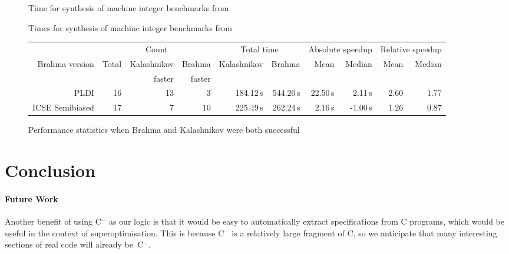\documentclass[a4paper]{llncs}
\newcommand{\newC}{C$^-$\xspace}
\begin{document}
\begin{figure}
\begin{center}
{\tiny

}
\end{center}
\caption{Time for synthesis of machine integer benchmarks from~\cite{brahma}
 \label{fig:results-table}}
\end{figure}

\begin{figure}
\begin{center}
{\tiny

}
\end{center}
\caption{Times for synthesis of machine integer benchmarks from~\cite{brahma-icse}}
\label{fig:icse-results-table}
\end{figure}



\begin{figure}

{\tiny
\begin{center}
 \begin{tabular}{r||r|r|r|r|r|r|r|r|r}
  & \multicolumn{3}{c}{Count} & \multicolumn{2}{|c}{Total time} & \multicolumn{2}{|c}{Absolute speedup} & \multicolumn{2}{|c}{Relative speedup} \\
  {\sc Brahma} version & Total & {\sc Kalashnikov} & {\sc Brahma} & {\sc Kalashnikov} & {\sc Brahma} & Mean & Median & Mean & Median \\
  &       & faster            & faster       &                   &              &      &        &      & \\
  \hline
  \hline
  PLDI & 16 & 13 & 3 & 184.12\,s & 544.20\,s & 22.50\,s & 2.11\,s & 2.60 & 1.77 \\
  ICSE Semibiased & 17 & 7 & 10 & 225.49\,s & 262.24\,s & 2.16\,s & -1.00\,s & 1.26 & 0.87
 \end{tabular}
\end{center}
}

 \caption{Performance statistics when {\sc Brahma} and {\sc Kalashnikov} were both successful
 \label{fig:stats-table}}
\end{figure}



\section{Conclusion}


\paragraph{Future Work}
Another benefit of using \newC as our logic is that it would be easy to
automatically extract specifications from C programs, which would be
useful in the context of superoptimisation.  This is because \newC is
a relatively large fragment of C, so we anticipate that many interesting
sections of real code will already be~\newC.


{}

\end{document}
